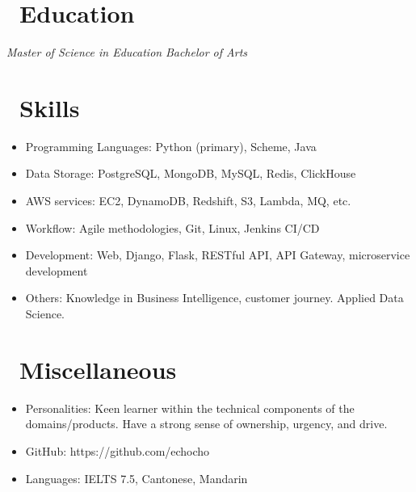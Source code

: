 \documentclass{resume}
\begin{document}
\section{\faGraduationCap\ Education}
\textit{Master of Science in Education}
\textit{Bachelor of Arts}

\section{\faCogs\ Skills}
\begin{itemize}[parsep=0.5ex]
  \item Programming Languages: Python (primary), Scheme, Java
  \item Data Storage: PostgreSQL, MongoDB, MySQL, Redis, ClickHouse
  \item AWS services: EC2, DynamoDB, Redshift, S3, Lambda, MQ, etc.
  \item Workflow: Agile methodologies, Git, Linux, Jenkins CI/CD
  \item Development: Web, Django, Flask, RESTful API, API Gateway, microservice development
  \item Others: Knowledge in Business Intelligence, customer journey. Applied Data Science.
\end{itemize}

\section{\faInfo\ Miscellaneous}
\begin{itemize}[parsep=0.5ex]
  \item Personalities: Keen learner within the technical components of the domains/products. Have a strong sense of ownership, urgency, and drive.
  \item GitHub: https://github.com/echocho
  \item Languages: IELTS 7.5, Cantonese, Mandarin
\end{itemize}

%
%
\end{document}
